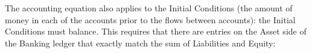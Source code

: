 
\begin{center}
\par\end{center}

The accounting equation also applies to the Initial Conditions (the
amount of money in each of the accounts prior to the flows between
accounts): the Initial Conditions must balance. This requires that
there are entries on the Asset side of the Banking ledger that exactly
match the sum of Liabilities and Equity:


\begin{center}
\par\end{center}

